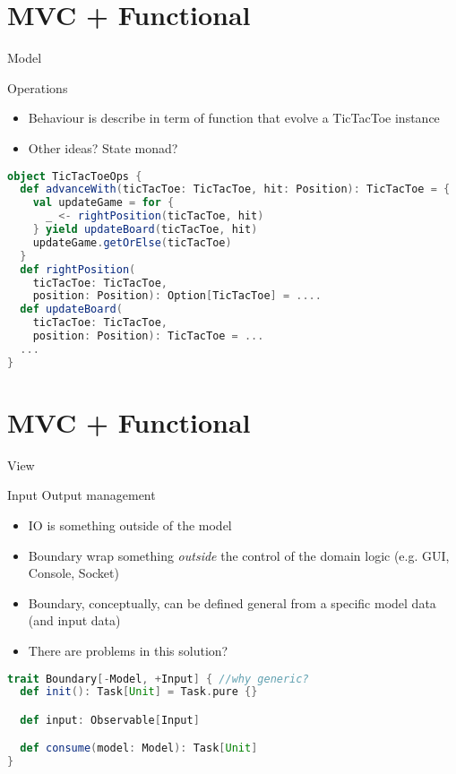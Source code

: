 \documentclass[presentation]{beamer}
\begin{document}
\section{MVC + Functional}
\begin{frame}[fragile]{Model}

\begin{block}{Operations}
\begin{itemize}
  \item Behaviour is describe in term of function that evolve a TicTacToe instance
  \item Other ideas? State monad?
\end{itemize}
\end{block}

\begin{lstlisting}[language=scala]
object TicTacToeOps {
  def advanceWith(ticTacToe: TicTacToe, hit: Position): TicTacToe = {
    val updateGame = for {
      _ <- rightPosition(ticTacToe, hit)
    } yield updateBoard(ticTacToe, hit)
    updateGame.getOrElse(ticTacToe)
  }
  def rightPosition(
    ticTacToe: TicTacToe, 
    position: Position): Option[TicTacToe] = ....
  def updateBoard(
    ticTacToe: TicTacToe, 
    position: Position): TicTacToe = ...
  ...
}
\end{lstlisting}

\end{frame}

\section{MVC + Functional}
\begin{frame}[fragile]{View}

\begin{block}{Input Output management}
\begin{itemize}
  \item IO is something outside of the model
  \item Boundary wrap something \emph{outside} the control of the domain logic (e.g. GUI, Console, Socket) 
  \item Boundary, conceptually, can be defined general from a specific model data (and input data)
  \item There are problems in this solution?
\end{itemize}
\end{block}

\begin{lstlisting}[language=scala]
trait Boundary[-Model, +Input] { //why generic?
  def init(): Task[Unit] = Task.pure {}

  def input: Observable[Input]

  def consume(model: Model): Task[Unit]
}
\end{lstlisting}

\end{frame}
\end{document}
